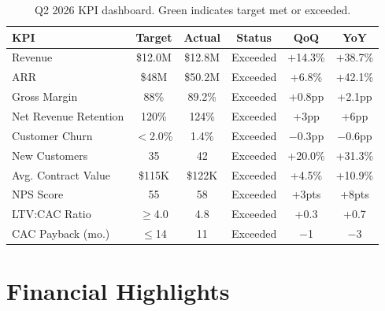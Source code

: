 \documentclass[
    language=english,
    doctype=stakeholder-report,
    institution=none,
]{../../omnilatex}
\begin{document}
\begin{table}[h]
    \centering
    \small
    \begin{tabular}{lccccc}
        \toprule
        \textbf{KPI} & \textbf{Target} & \textbf{Actual} & \textbf{Status} & \textbf{QoQ} & \textbf{YoY} \\
        \midrule
        Revenue            & \$12.0M & \$12.8M & \cellcolor{green!20}Exceeded & +14.3\% & +38.7\% \\
        ARR                & \$48M   & \$50.2M & \cellcolor{green!20}Exceeded & +6.8\%  & +42.1\% \\
        Gross Margin       & 88\%    & 89.2\%  & \cellcolor{green!20}Exceeded & +0.8pp  & +2.1pp \\
        Net Revenue Retention & 120\% & 124\% & \cellcolor{green!20}Exceeded & +3pp    & +6pp \\
        Customer Churn     & $<$2.0\% & 1.4\%  & \cellcolor{green!20}Exceeded & $-$0.3pp & $-$0.6pp \\
        New Customers      & 35      & 42      & \cellcolor{green!20}Exceeded & +20.0\% & +31.3\% \\
        Avg. Contract Value & \$115K & \$122K & \cellcolor{green!20}Exceeded & +4.5\%  & +10.9\% \\
        NPS Score          & 55      & 58      & \cellcolor{green!20}Exceeded & +3pts   & +8pts \\
        LTV:CAC Ratio      & $\geq$4.0 & 4.8   & \cellcolor{green!20}Exceeded & +0.3    & +0.7 \\
        CAC Payback (mo.)  & $\leq$14 & 11     & \cellcolor{green!20}Exceeded & $-$1    & $-$3 \\
        \bottomrule
    \end{tabular}
    \caption{Q2 2026 KPI dashboard. Green indicates target met or exceeded.}
\end{table}

\section{Financial Highlights}
\end{document}
